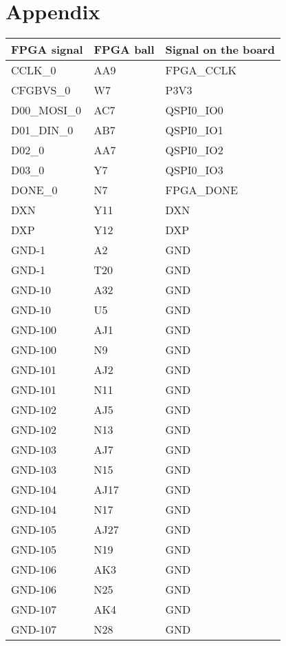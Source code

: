 \section{Appendix}

\begin{footnotesize}
	\begin{longtable}{|p{7cm}|p{1cm}|p{5cm}|}
		\hline
FPGA signal	&	FPGA ball	&	Signal on the board	\\ \hline
CCLK\_0	&	AA9	&	FPGA\_CCLK	\\ \hline
CFGBVS\_0	&	W7	&	P3V3	\\ \hline
D00\_MOSI\_0	&	AC7	&	QSPI0\_IO0	\\ \hline
D01\_DIN\_0	&	AB7	&	QSPI0\_IO1	\\ \hline
D02\_0	&	AA7	&	QSPI0\_IO2	\\ \hline
D03\_0	&	Y7	&	QSPI0\_IO3	\\ \hline
DONE\_0	&	N7	&	FPGA\_DONE	\\ \hline
DXN	&	Y11	&	DXN	\\ \hline
DXP	&	Y12	&	DXP	\\ \hline
GND-1	&	A2	&	GND	\\ \hline
GND-1	&	T20	&	GND	\\ \hline
GND-10	&	A32	&	GND	\\ \hline
GND-10	&	U5	&	GND	\\ \hline
GND-100	&	AJ1	&	GND	\\ \hline
GND-100	&	N9	&	GND	\\ \hline
GND-101	&	AJ2	&	GND	\\ \hline
GND-101	&	N11	&	GND	\\ \hline
GND-102	&	AJ5	&	GND	\\ \hline
GND-102	&	N13	&	GND	\\ \hline
GND-103	&	AJ7	&	GND	\\ \hline
GND-103	&	N15	&	GND	\\ \hline
GND-104	&	AJ17	&	GND	\\ \hline
GND-104	&	N17	&	GND	\\ \hline
GND-105	&	AJ27	&	GND	\\ \hline
GND-105	&	N19	&	GND	\\ \hline
GND-106	&	AK3	&	GND	\\ \hline
GND-106	&	N25	&	GND	\\ \hline
GND-107	&	AK4	&	GND	\\ \hline
GND-107	&	N28	&	GND	\\ \hline

\end{longtable}
\end{footnotesize}

